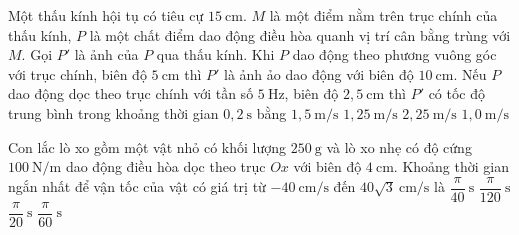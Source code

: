 \begin{ex}
Một thấu kính hội tụ có tiêu cự $15\ \text{cm}$. $M$ là một điểm nằm trên trục chính của thấu kính, $P$ là một chất điểm dao động điều hòa quanh vị trí cân bằng trùng với $M$. Gọi $P'$ là ảnh của $P$ qua thấu kính. Khi $P$ dao động theo phương vuông góc với trục chính, biên độ $5\ \text{cm}$ thì $P'$ là ảnh ảo dao động với biên độ $10\ \text{cm}$. Nếu $P$ dao động dọc theo trục chính với tần số $5\ \text{Hz}$, biên độ $2,5\ \text{cm}$ thì $P'$ có tốc độ trung bình trong khoảng thời gian $0,2\ \text{s}$ bằng
\choice
{$1,5\ \text{m/s}$}
{$1,25\ \text{m/s}$}
{\True $2,25\ \text{m/s}$}
{$1,0\ \text{m/s}$}
\end{ex}

\begin{ex}
Con lắc lò xo gồm một vật nhỏ có khối lượng $250\ \text{g}$ và lò xo nhẹ có độ cứng $100\ \text{N/m}$ dao động điều hòa dọc theo trục $Ox$ với biên độ $4\ \text{cm}$. Khoảng thời gian ngắn nhất để vận tốc của vật có giá trị từ $-40\ \text{cm/s}$ đến $40\sqrt{3}\ \text{cm/s}$ là
\choice
{\True $\dfrac{\pi}{40}\ \text{s}$}
{$\dfrac{\pi}{120}\ \text{s}$}
{$\dfrac{\pi}{20}\ \text{s}$}
{$\dfrac{\pi}{60}\ \text{s}$}
\end{ex}

